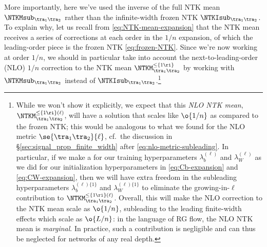 More importantly, here we've used the inverse of the full NTK mean
$\NTKMsub_{\tra_1\tra_2}$
rather than the infinite-width frozen NTK
$\NTKIsub_{\tra_1\tra_2}$.
To explain why, let us recall from \eqref{eq:NTK-mean-expansion} that the NTK mean receives a series of corrections at each order in the $1/n$ expansion, of which the leading-order piece is the frozen NTK \eqref{eq:frozen-NTK}. Since we're now working at order $1/n$, we should in particular take into account the next-to-leading-order (NLO) $1/n$ correction to the NTK mean
$\NTKM_{\tra_1\tra_2}^{\le\{1\ri\}}$ by working with $\NTKMsub_{\tra_1\tra_2}$ instead of $\NTKIsub_{\tra_1\tra_2}$.\footnote{
    While we won't show it explicitly, we expect that this \emph{NLO NTK mean}, $\NTKM_{\tra_1\tra_2}^{\le\{1\ri\}(\ell)}$, will have a solution that scales like $\o{1/n}$ as compared to the frozen NTK; this would be analogous to what we found for the NLO metric $\se{\tra_1\tra_2}{\ell}$, cf.~the discussion in \S\ref{sec:signal_prop_finite_width} after \eqref{eq:nlo-metric-subleading}. In particular, if we make a  for our training hyperparameters $\lambda_b^{(\ell)}$ and $\lambda_W^{(\ell)}$ as we did for our initialization hyperparameters in \eqref{eq:Cb-expansion} and \eqref{eq:CW-expansion}, then we will have extra freedom in the subleading hyperparameters $\lambda_b^{(\ell)\{1\}}$ and $\lambda_W^{(\ell)\{1\}}$ to eliminate the growing-in-$\ell$ contribution to $\NTKM_{\tra_1\tra_2}^{\le\{1\ri\}(\ell)}$. Overall, this will make the NLO correction to the NTK mean scale as $\o{1/n}$, subleading to the leading finite-width effects which scale as $\o{L/n}$: in the language of RG flow, the NLO NTK mean is \emph{marginal}. In practice, such a contribution is negligible and can thus be neglected for networks of any real depth.

}





